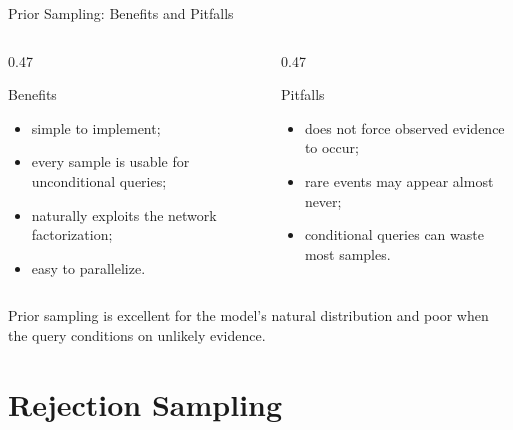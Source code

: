 \documentclass[aspectratio=169,10pt]{beamer}
\begin{document}
\begin{frame}[shrink=10]{Prior Sampling: Benefits and Pitfalls}
  \begin{columns}[T,onlytextwidth]
    \begin{column}{0.47\textwidth}
      \begin{block}{Benefits}
        \begin{itemize}
          \item simple to implement;
          \item every sample is usable for unconditional queries;
          \item naturally exploits the network factorization;
          \item easy to parallelize.
        \end{itemize}
      \end{block}
    \end{column}
    \begin{column}{0.47\textwidth}
      \begin{block}{Pitfalls}
        \begin{itemize}
          \item does not force observed evidence to occur;
          \item rare events may appear almost never;
          \item conditional queries can waste most samples.
        \end{itemize}
      \end{block}
    \end{column}
  \end{columns}

  \begin{keyidea}
    Prior sampling is excellent for the model's natural distribution and poor when the query conditions on unlikely evidence.
  \end{keyidea}
\end{frame}

\section{Rejection Sampling}
\end{document}

